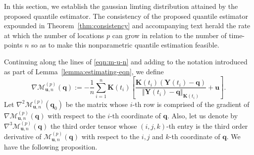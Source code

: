 \documentclass[aos]{imsart}
\theoremstyle{plain}
\theoremstyle{remark}
\newcommand{\Mcal}{\mathcal{M}}
\newcommand{\bb}[1]{\boldsymbol{#1}}
\newcommand{\cnam}[1]{\textcolor{mypurple}{#1}}
\begin{document}
In this section, we establish the gaussian limting distribution attained by the proposed quantile estimator.  The consistency of the proposed quantile estimator expounded \cnam{in Theorem~\ref{thm:consistency} and accompanying text herald} the rate at which the number of locations $p$ can grow \cnam{in relation} to the number of time-points $n$ so as to make this nonparametric quantile estimation feasible. 


\cnam{Continuing along the lines of \eqref{eqn:m-u-n} and  adding to the notation introduced as part of Lemma~\ref{lemma:estimating-eqn},} we define
\begin{equation*}
    \nabla \Mcal_{\bb{u},n}^{(p)} (\bb{q}) := -\dfrac{1}{n}\sum_{i=1}^n \bb{K}(t_i) \left[ \dfrac{\bb{K}(t_i) (\bb{Y}(t_i) - \bb{q})}{\Vert \bb{Y}(t_i) - \bb{q} \Vert_{\bb{K}(t_i)}} + \bb{u} \right]\label{eqn:m-u-n-prime}.
\end{equation*}
Let $\nabla^2 \Mcal_{\bb{u},n}^{(p)} (\bb{q}_0)$ be the matrix whose $i$-th row \cnam{is comprised of} the gradient of $\nabla \Mcal_{\bb{u},n}^{(p)} (\bb{q})$ with respect to the $i$-th coordinate of $\bb{q}$. Also, let us denote by $\nabla^3 \Mcal_{\bb{u},n}^{(p)}(\bb{q})$ the third order tensor whose $(i,j,k)$-th entry is the third order derivative of $\Mcal_{\bb{u},n}^{(p)}(\bb{q})$ with respect to the $i,j$ and $k$-th coordinate of $\bb{q}$. \cnam{We have the following proposition.}
\end{document}
